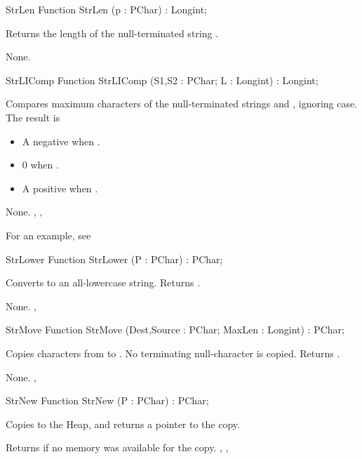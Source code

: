 \latex{}
\html{}
\begin{function}{StrLen}
\Declaration
Function StrLen (p : PChar) : Longint;

\Description

Returns the length of the null-terminated string .

\Errors
None.
\SeeAlso
{}
\end{function}
\latex{}
\html{}
\begin{function}{StrLIComp}
\Declaration
Function StrLIComp (S1,S2 : PChar; L : Longint) : Longint;

\Description

Compares maximum  characters of the null-terminated strings  
and , ignoring case.
The result is 
\begin{itemize}
\item A negative  when .
\item 0 when .
\item A positive  when .
\end{itemize}

\Errors
None.
\SeeAlso
{}, , 
\end{function}
For an example, see 
\begin{function}{StrLower}
\Declaration
Function StrLower (P : PChar) : PChar;

\Description

Converts  to an all-lowercase string. Returns .

\Errors
None.
\SeeAlso
{}, 
\end{function}
\latex{}
\html{}
\begin{function}{StrMove}
\Declaration
Function StrMove (Dest,Source : PChar; MaxLen : Longint) : PChar;

\Description

Copies  characters from  to . No
terminating null-character is copied.
Returns .

\Errors
None.
\SeeAlso
{}, 
\end{function}
\latex{}
\html{}
\begin{function}{StrNew}
\Declaration
Function StrNew (P : PChar) : PChar;

\Description

Copies  to the Heap, and returns a pointer to the copy.

\Errors
Returns  if no memory was available for the copy.
\SeeAlso
{}, , 
\end{function}
